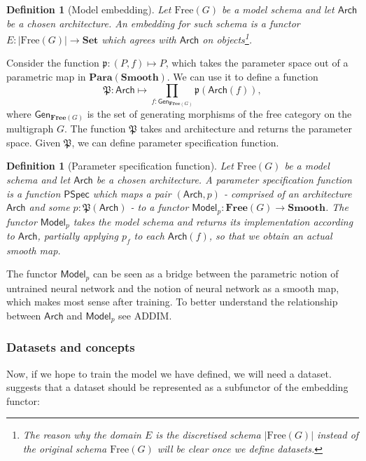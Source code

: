 \documentclass[12pt,a4paper,openright,twoside]{report}
\theoremstyle{plain}
\newtheorem{definition}[proposition]{Definition}
\theoremstyle{definition}
\begin{document}
\begin{definition}[Model embedding]
  Let $\mathrm{Free}(G)$ be a model schema and let $\mathsf{Arch}$ be a chosen architecture. An embedding for such schema is a functor $E: |\mathrm{Free}(G)| \to \mathbf{Set}$ which agrees with $\mathsf{Arch}$ on objects\footnote{The reason why the domain $E$ is the discretised schema $|\mathrm{Free}(G)|$ instead of the original schema $\mathrm{Free}(G)$ will be clear once we define datasets.}.
\end{definition}

Consider the function $\mathfrak{p}: (P,f) \mapsto P$, which takes the parameter space out of a parametric map in $\mathbf{Para}(\mathbf{Smooth})$. We can use it to define a function 
\[\mathfrak{P}: \mathsf{Arch} \mapsto \prod_{f : \mathsf{Gen}_{\mathbf{Free}(G)}}\mathfrak{p}(\mathsf{Arch}(f)),\]
where $\mathsf{Gen}_{\mathbf{Free}(G)}$ is the set of generating morphisms of the free category on the multigraph $G$. The function $\mathfrak{P}$ takes and architecture and returns the parameter space. Given $\mathfrak{P}$, we can define parameter specification function.

\begin{definition}[Parameter specification function]
  Let $\mathrm{Free}(G)$ be a model schema and let $\mathsf{Arch}$ be a chosen architecture. A parameter specification function is a function $\mathsf{PSpec}$ which maps a pair $(\mathsf{Arch}, p)$ - comprised of an architecture $\mathsf{Arch}$ and some $p : \mathfrak{P}(\mathsf{Arch})$ - to a functor $\mathsf{Model}_p: \mathbf{Free}(G) \to \mathbf{Smooth}$. The functor $\mathsf{Model}_p$ takes the model schema and returns its implementation according to $\mathsf{Arch}$, partially applying $p_f$ to each $\mathsf{Arch}(f)$, so that we obtain an actual smooth map. 
\end{definition}

The functor $\mathsf{Model}_p$ can be seen as a bridge between the parametric notion of untrained neural network and the notion of neural network as a smooth map, which makes most sense after training. To better understand the relationship between $\mathsf{Arch}$ and $\mathsf{Model}_p$ see ADDIM.

\subsubsection{Datasets and concepts}

Now, if we hope to train the model we have defined, we will need a dataset. \cite{gavranovic2019compositional} suggests that a dataset should be represented as a subfunctor of the embedding functor:
\end{document}
